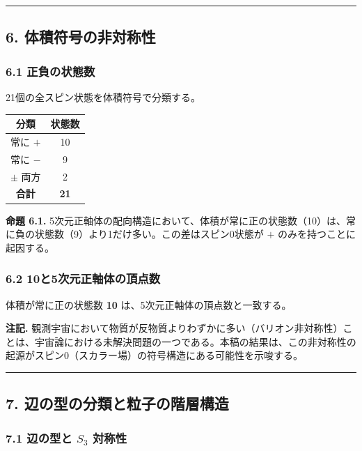 \documentclass[a4paper,11pt]{ltjsarticle}
\newcounter{none}
\begin{document}
\begin{center}\rule{0.5\linewidth}{0.5pt}\end{center}

\subsection*{6. 体積符号の非対称性}

\subsubsection*{6.1 正負の状態数}

21個の全スピン状態を体積符号で分類する。

{\def\LTcaptype{none}
\begin{longtable}[]{@{}cc@{}}
\toprule
分類 & 状態数 \\
\midrule
\endhead
\bottomrule
\endlastfoot
常に $+$ & 10 \\
常に $-$ & 9 \\
$\pm$ 両方 & 2 \\
\textbf{合計} & \textbf{21} \\
\end{longtable}
}

\textbf{命題 6.1.}
5次元正軸体の配向構造において、体積が常に正の状態数（10）は、常に負の状態数（9）より1だけ多い。この差はスピン0状態が
$+$ のみを持つことに起因する。

\subsubsection*{6.2 10と5次元正軸体の頂点数}

体積が常に正の状態数 \textbf{10} は、5次元正軸体の頂点数と一致する。

\textbf{注記.}
観測宇宙において物質が反物質よりわずかに多い（バリオン非対称性）ことは、宇宙論における未解決問題の一つである。本稿の結果は、この非対称性の起源がスピン0（スカラー場）の符号構造にある可能性を示唆する。

\begin{center}\rule{0.5\linewidth}{0.5pt}\end{center}

\subsection*{7. 辺の型の分類と粒子の階層構造}

\subsubsection*{7.1 辺の型と $S_3$ 対称性}
\end{document}
